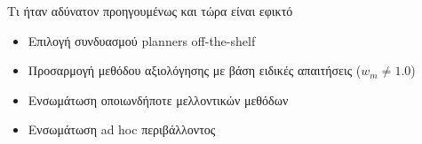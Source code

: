 \begin{frame}{Τι ήταν αδύνατον προηγουμένως και τώρα είναι εφικτό}

  \begin{itemize}
    \item Επιλογή συνδυασμού planners off-the-shelf
    \item Προσαρμογή μεθόδου αξιολόγησης με βάση ειδικές απαιτήσεις ($w_m \neq 1.0$)
    \item Ενσωμάτωση οποιωνδήποτε μελλοντικών μεθόδων
    \item Ενσωμάτωση ad hoc περιβάλλοντος
  \end{itemize}

\end{frame}
